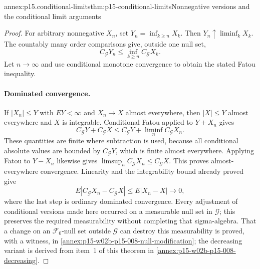 \begin{annexitem}{annex:p15.conditional-limits}{thm:p15-conditional-limits}{Nonnegative versions and the conditional limit arguments}
\begin{proof}
For arbitrary nonnegative \(X_n\), set \(Y_n=\inf_{k\geq n}X_k\).
Then \(Y_n\uparrow\liminf_kX_k\).
The countably many order comparisons give, outside one null set,
\[
                       C_{\mathcal G}Y_n
                               \leq\inf_{k\geq n}C_{\mathcal G}X_k.
\]
Let \(n\to\infty\) and use conditional monotone convergence to obtain
the stated Fatou inequality.

\paragraph{Dominated convergence.}
If \(|X_n|\leq Y\) with \(EY<\infty\) and \(X_n\to X\) almost
everywhere, then \(|X|\leq Y\) almost everywhere and \(X\) is integrable.
Conditional Fatou applied to \(Y+X_n\) gives
\[
                   C_{\mathcal G}Y+C_{\mathcal G}X
                      \leq C_{\mathcal G}Y+\liminf_nC_{\mathcal G}X_n.
\]
These quantities are finite where subtraction is used, because
all conditional absolute values are bounded by \(C_{\mathcal G}Y\),
which is finite almost everywhere. Applying Fatou to \(Y-X_n\)
likewise gives \(\limsup_nC_{\mathcal G}X_n\leq C_{\mathcal G}X\).
This proves almost-everywhere convergence.
Linearity and the integrability bound already proved give
\[
            E|C_{\mathcal G}X_n-C_{\mathcal G}X|\leq E|X_n-X|\to0,
\]
where the last step is ordinary dominated convergence.
Every adjustment of conditional versions made here occurred on a
measurable null set in \(\mathcal G\); this preserves the required
measurability without completing that sigma-algebra.
That a change on an \(\mathcal F_0\)-null set outside \(\mathcal G\)
can destroy this measurability is proved, with a witness, in
\cref{annex:p15-w02b-p15-008-null-modification}; the decreasing variant
is derived from item~1 of this theorem in
\cref{annex:p15-w02b-p15-008-decreasing}.
\end{proof}
\end{annexitem}

